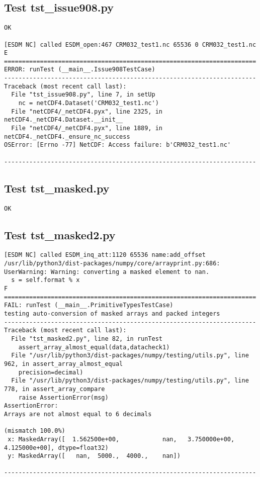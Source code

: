 \subsection{Test tst\_issue908.py}

\begin{verbatim}
OK

[ESDM NC] called ESDM_open:467 CRM032_test1.nc 65536 0 CRM032_test1.nc
E
======================================================================
ERROR: runTest (__main__.Issue908TestCase)
----------------------------------------------------------------------
Traceback (most recent call last):
  File "tst_issue908.py", line 7, in setUp
    nc = netCDF4.Dataset('CRM032_test1.nc')
  File "netCDF4/_netCDF4.pyx", line 2325, in netCDF4._netCDF4.Dataset.__init__
  File "netCDF4/_netCDF4.pyx", line 1889, in netCDF4._netCDF4._ensure_nc_success
OSError: [Errno -77] NetCDF: Access failure: b'CRM032_test1.nc'

----------------------------------------------------------------------
\end{verbatim}

\subsection{Test tst\_masked.py}

\begin{verbatim}
OK
\end{verbatim}

\subsection{Test tst\_masked2.py}

\begin{verbatim}
[ESDM NC] called ESDM_inq_att:1120 65536 name:add_offset
/usr/lib/python3/dist-packages/numpy/core/arrayprint.py:686: UserWarning: Warning: converting a masked element to nan.
  s = self.format % x
F
======================================================================
FAIL: runTest (__main__.PrimitiveTypesTestCase)
testing auto-conversion of masked arrays and packed integers
----------------------------------------------------------------------
Traceback (most recent call last):
  File "tst_masked2.py", line 82, in runTest
    assert_array_almost_equal(data,datacheck1)
  File "/usr/lib/python3/dist-packages/numpy/testing/utils.py", line 962, in assert_array_almost_equal
    precision=decimal)
  File "/usr/lib/python3/dist-packages/numpy/testing/utils.py", line 778, in assert_array_compare
    raise AssertionError(msg)
AssertionError:
Arrays are not almost equal to 6 decimals

(mismatch 100.0%)
 x: MaskedArray([  1.562500e+00,            nan,   3.750000e+00,   4.125000e+00], dtype=float32)
 y: MaskedArray([   nan,  5000.,  4000.,    nan])

----------------------------------------------------------------------
\end{verbatim}


